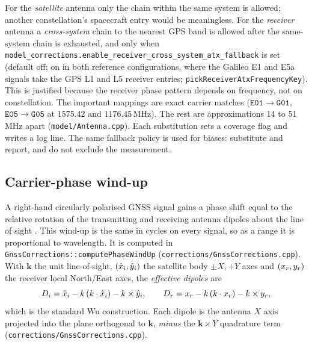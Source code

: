 \documentclass[main.tex]{subfiles}
\begin{document}
For the \emph{satellite} antenna only the chain within the same system
is allowed; another constellation's spacecraft entry would be
meaningless.  For the \emph{receiver} antenna a \emph{cross-system}
chain to the nearest GPS band is allowed after the same-system chain is
exhausted, and only when
\texttt{model\_corrections.enable\_receiver\_cross\_system\_atx\_fallback}
is set (default off; on in both reference configurations, where the
Galileo E1 and E5a signals take the GPS L1 and L5 receiver entries;
\texttt{pickReceiverAtxFrequencyKey}).  This is justified because the
receiver phase pattern depends on frequency, not on constellation.  The
important mappings are exact carrier matches
($\mathtt{E01}\!\to\!\mathtt{G01}$, $\mathtt{E05}\!\to\!\mathtt{G05}$ at
$1575.42$ and $1176.45$\,MHz).  The rest are approximations 14 to
51\,MHz apart (\texttt{model/Antenna.cpp}).  Each substitution sets a
coverage flag and writes a log line.  The same fallback policy is used
for biases: substitute and report, and do not exclude the measurement.

\subsection{Carrier-phase wind-up}\label{sec:obsphys-windup}

A right-hand circularly polarised GNSS signal gains a phase shift equal
to the relative rotation of the transmitting and receiving antenna
dipoles about the line of sight \cite{wuebbena1985software}.  This
wind-up is the same in cycles on every signal, so as a range it is
proportional to wavelength.  It is computed in
\texttt{GnssCorrections::computePhaseWindUp}
(\texttt{corrections/GnssCorrections.cpp}).  With $\bm{k}$ the unit
line-of-sight, $(\hat{x}_i,\hat{y}_i)$ the satellite body $\pm X,+Y$ axes and
$(x_r,y_r)$ the receiver local North/East axes, the
\emph{effective dipoles} are
\begin{equation}
D_i = \hat{x}_i - k\,(k\cdot\hat{x}_i) - k\times\hat{y}_i,
\qquad
D_r = x_r - k\,(k\cdot x_r) - k\times y_r,
\label{eq:obsphys-windup-dipoles}
\end{equation}
which is the standard Wu construction.  Each dipole is the antenna $X$
axis projected into the plane orthogonal to $\bm{k}$, \emph{minus} the
$\bm{k}\times Y$ quadrature term (\texttt{corrections/GnssCorrections.cpp}).
\end{document}
